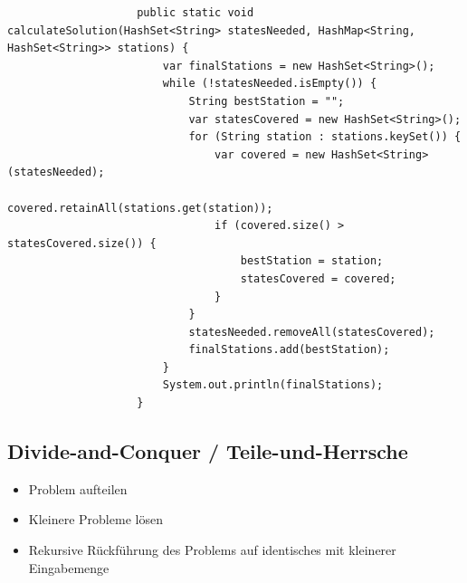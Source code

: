 \documentclass[a4paper, landscape, 8pt]{scrartcl}
\begin{document}
\begin{multicols*}{4}
                    \begin{lstlisting}
                    public static void calculateSolution(HashSet<String> statesNeeded, HashMap<String, HashSet<String>> stations) {
                        var finalStations = new HashSet<String>();
                        while (!statesNeeded.isEmpty()) {
                            String bestStation = "";
                            var statesCovered = new HashSet<String>();
                            for (String station : stations.keySet()) {
                                var covered = new HashSet<String>(statesNeeded);
                                covered.retainAll(stations.get(station));
                                if (covered.size() > statesCovered.size()) {
                                    bestStation = station;
                                    statesCovered = covered;
                                }
                            }
                            statesNeeded.removeAll(statesCovered);
                            finalStations.add(bestStation);
                        }
                        System.out.println(finalStations);
                    }
                    \end{lstlisting}

            \subsection{Divide-and-Conquer / Teile-und-Herrsche}
                \begin{itemize}
                    \item Problem aufteilen
                    \item Kleinere Probleme lösen
                    \item Rekursive Rückführung des Problems auf identisches mit kleinerer Eingabemenge
                \end{itemize}


\end{multicols*}
\end{document}
